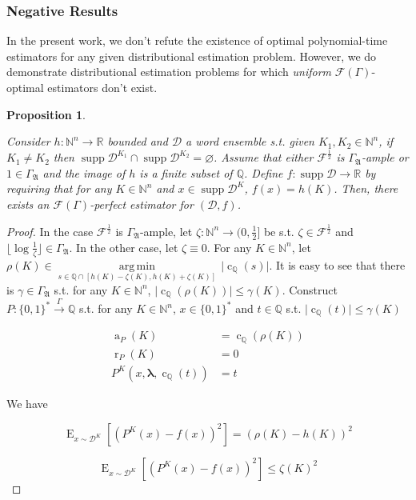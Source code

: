 \documentclass{article}
\numberwithin{equation}{section}
\theoremstyle{definition}
\theoremstyle{plain}
\newtheorem{proposition}{Proposition}[section]
\newcommand{\Bool}{\{0,1\}}
\newcommand{\Words}{{\Bool^*}}
\DeclareMathOperator{\Supp}{supp}
\DeclareMathOperator{\E}{E}
\DeclareMathOperator{\R}{r}
\DeclareMathOperator{\A}{a}
\DeclareMathOperator{\En}{c}
\newcommand{\Argmin}[1]{\underset{#1}{\operatorname{arg\,min}}\,}
\newcommand{\Nats}{\mathbb{N}}
\newcommand{\Rats}{\mathbb{Q}}
\newcommand{\Reals}{\mathbb{R}}
\newcommand{\NatFun}{\Nats^n \rightarrow}
\newcommand{\Estr}{\bm{\lambda}}
\newcommand{\Abs}[1]{\lvert #1 \rvert}
\newcommand{\Floor}[1]{\lfloor #1 \rfloor}
\newcommand{\Dist}{\mathcal{D}}
\newcommand{\GrowA}{\Gamma_{\mathfrak{A}}}
\newcommand{\Fall}{\mathcal{F}}
\newcommand{\EG}{\Fall(\Gamma)}
\newcommand{\Scheme}{\xrightarrow{\Gamma}}
\begin{document}
\subsubsection{Negative Results}

In the present work, we don't refute the existence of optimal polynomial-time estimators for any given distributional estimation problem. However, we do demonstrate distributional estimation problems for which \emph{uniform} ${\EG}$-optimal estimators don't exist.

\begin{samepage}
\begin{proposition}
\label{prp:tally_perfect}

Consider ${h: \Nats^n \rightarrow \Reals}$ bounded and ${\Dist}$ a word ensemble s.t. given ${K_1, K_2 \in \Nats^n}$, if ${K_1 \ne K_2}$ then ${\Supp \Dist^{K_1} \cap \Supp \Dist^{K_2} = \varnothing}$. Assume that either ${\Fall^{\frac{1}{2}}}$ is ${\GrowA}$-ample or ${1 \in \GrowA}$ and the image of ${h}$ is a finite subset of ${\Rats}$. Define ${f: \Supp \Dist \rightarrow \Reals}$ by requiring that for any ${K \in \Nats^n}$ and ${x \in \Supp \Dist^K}$, ${f(x)=h(K)}$. Then, there exists an ${\EG}$-perfect estimator for ${(\Dist,f)}$.

\end{proposition}
\end{samepage}

\begin{proof}

In the case ${\Fall^{\frac{1}{2}}}$ is ${\GrowA}$-ample, let $\zeta: \NatFun (0,\frac{1}{2}]$ be s.t.  $\zeta \in \Fall^{\frac{1}{2}}$ and $\Floor{\log \frac{1}{\zeta}} \in \GrowA$. In the other case, let ${\zeta \equiv 0}$. For any $K \in \Nats^n$, let ${\rho(K) \in \Argmin{s \in \Rats \cap [h(K)-\zeta(K),h(K)+\zeta(K)]} \Abs{\En_\Rats(s)}}$. It is easy to see that there is $\gamma \in \GrowA$ s.t. for any ${K \in \Nats^n}$, ${\Abs{\En_\Rats(\rho(K))} \leq \gamma(K)}$. Construct ${P: \Words \Scheme \Rats}$ s.t. for any ${K \in \Nats^n}$, ${x \in \Words}$ and ${t \in \Rats}$ s.t. ${\Abs{\En_\Rats(t)} \leq \gamma(K)}$ 

\begin{align*}
\A_P(K) &= \En_\Rats(\rho(K)) \\
\R_P(K) &= 0 \\
P^K(x,\Estr,\En_\Rats(t)) &= t
\end{align*}

We have

\[\E_{x \sim \Dist^K}[(P^K(x)-f(x))^2] = (\rho(K)-h(K))^2\]

\[\E_{x \sim \Dist^K}[(P^K(x)-f(x))^2] \leq \zeta(K)^2\]
%
\end{proof}
\end{document}

